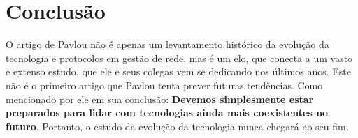\documentclass[12pt]{article}
\begin{document}
\section*{Conclusão}
	O artigo de Pavlou não é apenas um levantamento histórico da evolução da tecnologia e protocolos em gestão de rede, mas é um elo, que conecta a um vasto e extenso estudo, que ele e seus colegas vem se dedicando nos últimos anos.
Este não é o primeiro artigo que Pavlou tenta prever futuras tendências. Como mencionado por ele em sua conclusão: \textbf{Devemos simplesmente estar preparados para lidar com tecnologias ainda mais coexistentes no futuro}. Portanto, o estudo da evolução da tecnologia nunca chegará ao seu fim.

\end{document}
